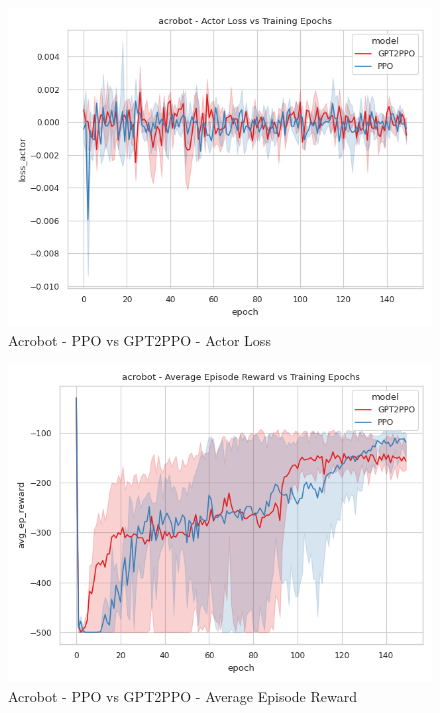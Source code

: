 \begin{figure}[htbp]
    \centerline{\includegraphics[width=\columnwidth]{./img/acrobot-loss_actor-model.png}}
    \caption{Acrobot - PPO vs GPT2PPO - Actor Loss}
    \label{acrobot-loss_actor-model}
\end{figure}

\begin{figure}[htbp]
    \centerline{\includegraphics[width=\columnwidth]{./img/acrobot-avg_ep_reward-model.png}}
    \caption{Acrobot - PPO vs GPT2PPO - Average Episode Reward}
    \label{acrobot-avg_ep_reward-model}
\end{figure}


